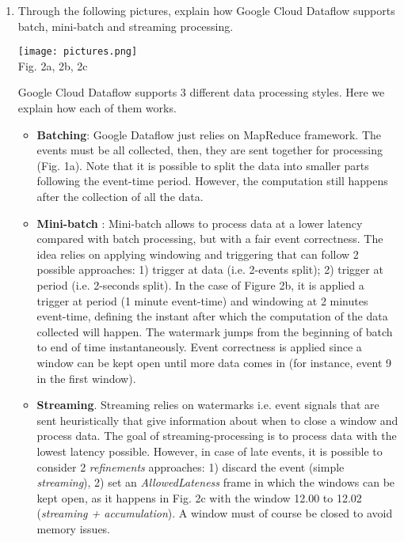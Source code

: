 \documentclass[]{report}
\begin{document}
\begin{enumerate}
 \item Through the following pictures, explain how Google Cloud Dataflow supports batch, mini-batch and
streaming processing.\\

\begin{center}
\texttt{[image: pictures.png]}\\
Fig. 2a, 2b, 2c
\end{center}
 
 Google Cloud Dataflow supports 3 different data processing styles. Here we explain how each of them works.
\begin{itemize}
    \item \textbf{Batching}: Google Dataflow just relies on MapReduce framework. The events must be all collected, then, they are sent together for  processing (Fig. 1a). Note that it is possible to split the data into smaller parts following the event-time period. However, the computation still happens after the collection of all the data. 
    \item \textbf{Mini-batch }: Mini-batch allows to process data at a lower latency compared with batch processing, but with a fair event correctness. The idea relies on applying windowing and triggering that can follow 2 possible approaches: 1) trigger at data (i.e. 2-events split); 2) trigger at period (i.e. 2-seconds split). In the case of Figure 2b, it is applied a trigger at period (1 minute event-time) and windowing at 2 minutes event-time, defining the instant after which the computation of the data collected will happen. The watermark jumps from the beginning of batch to end of time instantaneously. Event correctness is applied since a window can be kept open until more data comes in (for instance, event 9 in the first window).
    \item \textbf{Streaming}. Streaming relies on watermarks i.e. event signals that are sent heuristically that give information about when to close a window and process data. The goal of streaming-processing is to process data with the lowest latency possible. However, in case of late events, it is possible to consider 2 \textit{refinements} approaches: 1) discard the event (simple \textit{streaming}), 2) set an \textit{AllowedLateness} frame in which the windows can be kept open, as it happens in Fig. 2c with the window 12.00 to 12.02 (\textit{streaming + accumulation}). A window must of course be closed to avoid memory issues.
\end{itemize}

 

\end{enumerate}
\end{document}
